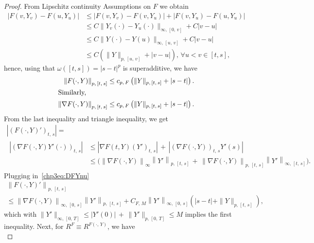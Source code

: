 \documentclass[10pt]{amsart}
\theoremstyle{definition}\newtheorem{defi}[theo]{Definition}\newtheorem{rema}[theo]{Remark}\newtheorem{exam}[theo]{Example}\newtheorem{exem}[theo]{Example}\newtheorem{nota}[theo]{Notation}
\let\oldforall\forall
\renewcommand*{\forall}{\mathrel{\oldforall}}
\begin{document}
\begin{proof}
From Lipschitz continuity Assumptions on $F$ we obtain
\begin{align*}
\left|F\left(v,Y_v\right)-F\left(u,Y_u\right)\right|
&\leq \left|F\left(v,Y_v\right)-F\left(v,Y_{u}\right)\right|+\left|F\left(v,Y_{u}\right)-F\left(u,Y_u\right)\right|\\
&\leq C\|Y_v(\cdot)-Y_{u}(\cdot)\|_{\infty,\,[0,\, v]}+C|v-u|\\
&\leq C\|Y(\cdot)-Y(u)\|_{\infty,\,[u,\,v]}+C|v-u|\\
&\leq C\left(\|Y\|_{p,\,[u,\,v]}+|v-u|\right),\, \forall u<v\in [t, s],
\end{align*}
hence, using that $\omega([t, s])=|s-t|^p$ is superadditive, we have
\begin{align}
\left\|F(\cdot, Y)\right\|_{p,\,[t,\,s]} &\leq c_{p,\,F}\left(\|Y\|_{p,\,[t,\,s]}+|s-t|\right). \label{chp3eq:DYp}\\
\intertext{Similarly,}
\left\|\nabla F(\cdot, Y)\right\|_{p,\,[t,\,s]} &\leq c_{p,\,F}\left(\|Y\|_{p,\,[t,\,s]}+|s-t|\right).\label{chp3eq:DFYnu}
\end{align}
From the last inequality and triangle inequality, we get
\begin{multline*}
\left|\left(F(\cdot,Y)'\right)_{t,\,s}\right| = \\
\begin{aligned}
\left|\left(\nabla F(\cdot,Y) Y'(\cdot)\right)_{t,\,s}\right|
&\leq \left|\nabla F(t,Y)\left(Y'\right)_{t,\,s}\right|\, +\,\left|\left(\nabla F(\cdot, Y)\right)_{t,\,s}Y'(s)\right|\\
&\leq\Big(\left\|\nabla F(\cdot,Y)\right\|_{\infty}\left\|Y'\right\|_{p,\,[t,\,s]}\,+\,\left\|\nabla F(\cdot, Y)\right\|_{p,\,[t,\,s]}\left\|Y'\right\|_{\infty,\,[t,\,s]}\Big).
\end{aligned}
\end{multline*}
Plugging in~\eqref{chp3eq:DFYnu}
\begin{multline}\label{chp3eq:FYnu}
\left\|F(\cdot, Y)'\right\|_{p,\,[t,\,s]}\\
\leq \left\|\nabla F(\cdot,Y)\right\|_{\infty,\, [0,\,s]}\left\|Y'\right\|_{p,\,[t,\,s]}+C_{F,\,M}\left\|Y'\right\|_{\infty,\,[0,\,s]}\left(|s-t|+ \|Y\|_{p,\,[t,\,s]}\right),
\end{multline}
which with $\|Y'\|_{\infty,\,[0,\,T]}\leq |Y'(0)|\,+\, \|Y'\|_{p,\,[0,\,T]}\leq M$ implies the first inequality. Next, for $R^F\equiv R^{F(\cdot,\,Y)}$, we have
\begin{equation}\label{chp3eq:RFts}

\end{equation}
\end{proof}
\end{document}
